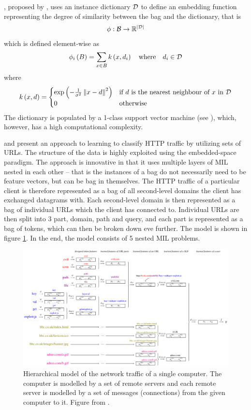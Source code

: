 , proposed by \cite{chen_miles:_2006}, uses an instance dictionary \( \mathcal{D} \) to define an embedding function representing the degree of similarity between the bag and the dictionary, that is
\[ \phi : \mathcal{B} \to \mathbb{R}^{\left\lvert \mathcal{D} \right\rvert} \]
which is defined element-wise as
\[ \phi_i \left( B \right) = \sum_{x \in B} k \left( x, d_i \right) \quad \text{where} \quad d_i \in \mathcal{D} \]
where
\[ k \left( x, d \right) = \begin{cases}
		\exp \left( - \frac{1}{\sigma^2} \left\lVert x - d \right\rVert^2 \right) &\text{if } d \text{ is the nearest neighbour of } x \text{ in } \mathcal{D} \\
		0 &\text{otherwise}
	\end{cases} \]
The dictionary is populated by a 1-class support vector machine (see \cite{zhu_1-norm_2004}), which, however, has a high computational complexity.

\cite{pevny_nested_2020} and \cite{dedic_hierarchicke_2017} present an approach to learning to classify HTTP traffic by utilizing sets of URLs. The structure of the data is highly exploited using the embedded-space paradigm. The approach is innovative in that it uses multiple layers of MIL nested in each other -- that is the instances of a bag do not necessarily need to be feature vectors, but can be bag in themselves. The HTTP traffic of a particular client is therefore represented as a bag of all second-level domains the client has exchanged datagrams with. Each second-level domain is then represented as a bag of individual URLs which the client has connected to. Individual URLs are then split into 3 part, domain, path and query, and each part is represented as a bag of tokens, which can then be broken down eve further. The model is shown in figure \ref{fig:HTTP-paper}. In the end, the model consists of 5 nested MIL problems.

\begin{figure}
	\centering
	\includegraphics[width=\textwidth]{images/HTTP-paper/HTTP-paper.pdf}
	\caption{Hierarchical model of the network traffic of a single computer. The computer is modelled by a set of remote servers and each remote server is modelled by a set of messages (connections) from the given computer to it. Figure from \cite{pevny_nested_2020}.}\label{fig:HTTP-paper}
\end{figure}

